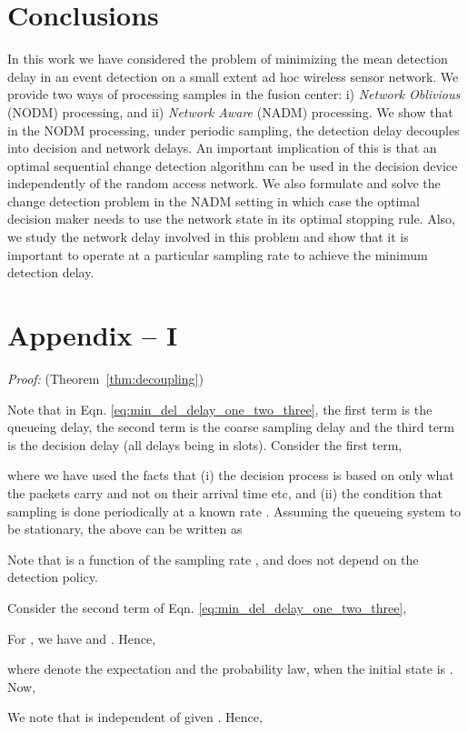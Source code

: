 \documentclass[acmtosn]{acmtrans2m}
\begin{document}
\section{Conclusions}
In this work we have considered the problem of minimizing the mean
detection delay in an event detection on a small extent ad hoc wireless
sensor network. We provide two ways of processing samples in the fusion
center: i) {\em Network Oblivious} ({\sf NODM}) processing, and ii) {\em
Network Aware} ({\sf NADM}) processing. We show that in the  {\sf NODM}
processing, under periodic sampling, the detection delay decouples into
decision and network delays. An important implication of this is that an
optimal sequential change detection algorithm can be used in the
decision device independently of the random access network. We also
formulate and solve the change detection problem in the {\sf NADM}
setting in which case the optimal decision maker needs to use the
network state in its optimal stopping rule. Also, we study the network
delay involved in this problem and show that it is important to operate
at a particular sampling rate to achieve the minimum detection delay.  

\section*{Appendix -- I}
\emph{Proof:} (Theorem~\ref{thm:decoupling})

Note that in Eqn. \ref{eq:min_del_delay_one_two_three}, the first term is the 
queueing delay, the second term is the coarse sampling delay and the third
term is the decision delay (all delays being in slots). Consider the first term,

where we have used the facts that (i) the decision process is based on only
what the packets carry and not on their arrival time etc, and (ii) the condition 
that sampling is done periodically at a known rate . Assuming the queueing 
system to be stationary, the above can be written as

Note that  is a function of the sampling rate , and does not depend on
the detection policy. 

Consider the second term of Eqn. \ref{eq:min_del_delay_one_two_three},

For , we have  and . Hence, 

where  
denote the expectation and  
the probability law, when the 
initial state is .
Now,


We note that  is independent of  given . Hence,
\end{document}
